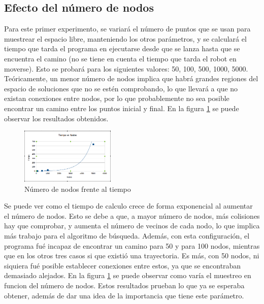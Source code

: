 \subsection{Efecto del número de nodos}

Para este primer experimento, se variará el número de puntos que se usan para muestrear el espacio libre, manteniendo los otros parámetros, y se calculará el tiempo que tarda el programa en ejecutarse desde que se lanza hasta que se encuentra el camino (no se tiene en cuenta el tiempo que tarda el robot en moverse). Esto se probará para los siguientes valores: 50, 100, 500, 1000, 5000.\\

Teóricamente, un menor número de nodos implica que habrá grandes regiones del espacio de soluciones que no se estén comprobando, lo que llevará a que no existan conexiones entre nodos, por lo que probablemente no sea posible encontrar un camino entre los puntos inicial y final.  En la figura \ref{fig:nodos_vs_t} se puede observar los resultados obtenidos.

\begin{figure}[H]
		\centering
        \includegraphics[width=0.4\textwidth]{images/t_vs_nodos.png}
        \caption{Número de nodos frente al tiempo}
        \label{fig:nodos_vs_t}
\end{figure} 

Se puede ver como el tiempo de calculo crece de forma exponencial al aumentar el número de nodos. Esto se debe a que, a mayor número de nodos, más colisiones hay que comprobar, y aumenta el número de vecinos de cada nodo, lo que implica más trabajo para el algoritmo de búsqueda. Además, con esta configuración, el programa fué incapaz de encontrar un camino para 50 y para 100 nodos, mientras que en los otros tres casos si que existió una trayectoria. Es más, con 50 nodos, ni siquiera fué posible establecer conexiones entre estos, ya que se encontraban demasiado alejados. En la figura \ref{fig:nodos_vs_t} se puede observar como varía el muestreo en funcion del número de nodos. Estos resultados prueban lo que ya se esperaba obtener, además de dar una idea de la importancia que tiene este parámetro.\\ 

